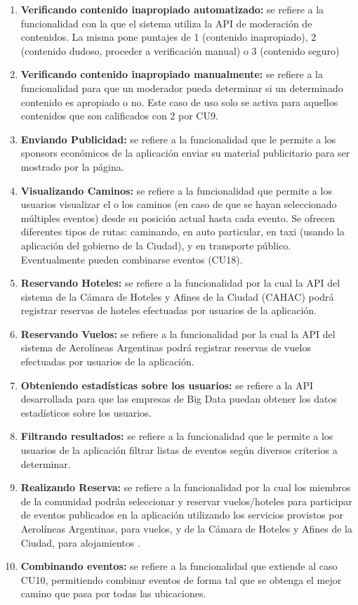 \begin{enumerate}
  \item \textbf{Verificando contenido inapropiado automatizado:} se refiere a la funcionalidad con la que el sistema utiliza la API de moderación de contenidos. La misma pone puntajes de 1 (contenido inapropiado), 2 (contenido dudoso, proceder a verificación manual) o 3 (contenido seguro)
  \item \textbf{Verificando contenido inapropiado manualmente:} se refiere a la funcionalidad para que un moderador pueda determinar si un determinado contenido es apropiado o no. Este caso de uso solo se activa para aquellos contenidos que son calificados con 2 por CU9.
  \item \textbf{Enviando Publicidad:} se refiere a la funcionalidad que le permite a los sponsors económicos de la aplicación enviar su material publicitario para ser mostrado por la página.
  \item \textbf{Visualizando Caminos:} se refiere a la funcionalidad que permite a los usuarios visualizar el o los caminos (en caso de que se hayan seleccionado múltiples eventos) desde su posición actual hasta cada evento. Se ofrecen diferentes tipos de rutas: caminando, en auto particular, en taxi (usando la aplicación del gobierno de la Ciudad), y en transporte público. Eventualmente pueden combinarse eventos (CU18).
  \item \textbf{Reservando Hoteles:} se refiere a la funcionalidad por la cual la API del sistema de la Cámara de Hoteles y Afines de la Ciudad (CAHAC) podrá registrar reservas de hoteles efectuadas por usuarios de la aplicación.
  \item \textbf{Reservando Vuelos:} se refiere a la funcionalidad por la cual la API del sistema de Aerolíneas Argentinas podrá registrar reservas de vuelos efectuadas por usuarios de la aplicación.
  \item  \textbf{Obteniendo estadísticas sobre los usuarios:} se refiere a la API desarrollada para que las empresas de Big Data puedan obtener los datos estadísticos sobre los usuarios.
  \item  \textbf{Filtrando resultados:} se refiere a la funcionalidad que le permite a los usuarios de la aplicación filtrar listas de eventos según diversos criterios a determinar.
  \item  \textbf{Realizando Reserva:} se refiere a la funcionalidad por la cual los miembros de la comunidad podrán seleccionar y reservar vuelos/hoteles para participar de eventos publicados en la aplicación utilizando los servicios provistos por Aerolíneas Argentinas, para vuelos, y de la Cámara de Hoteles y Afines de la Ciudad, para alojamientos .
  \item \textbf{Combinando eventos:}  se refiere a la funcionalidad que extiende al caso CU10, permitiendo combinar eventos de forma tal que se obtenga el mejor camino que pasa por todas las ubicaciones.
\end{enumerate}